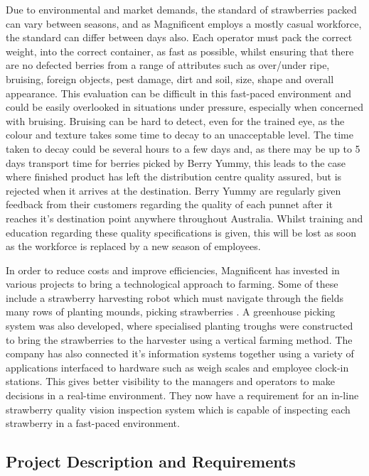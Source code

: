 \documentclass[fleqn,twoside]{article}
\begin{document}
Due to environmental and market demands, the standard of strawberries packed can vary between seasons, and as Magnificent employs a mostly casual workforce, the standard can differ between days also. Each operator must pack the correct weight, into the correct container, as fast as possible, whilst ensuring that there are no defected berries from a range of attributes such as over/under ripe, bruising, foreign objects, pest damage, dirt and soil, size, shape and overall appearance. This evaluation can be difficult in this fast-paced environment and could be easily overlooked in situations under pressure, especially when concerned with bruising. Bruising can be hard to detect, even for the trained eye, as the colour and texture takes some time to decay to an unacceptable level. The time taken to decay could be several hours to a few days and, as there may be up to 5 days transport time for berries picked by Berry Yummy, this leads to the case where finished product has left the distribution centre quality assured, but is rejected when it arrives at the destination. Berry Yummy are regularly given feedback from their customers regarding the quality of each punnet after it reaches it's destination point anywhere throughout Australia. Whilst training and education regarding these quality specifications is given, this will be lost as soon as the workforce is replaced by a new season of employees.  

In order to reduce costs and improve efficiencies, Magnificent has invested in various projects to bring a technological approach to farming. Some of these include a strawberry harvesting robot which must navigate through the fields many rows of planting mounds, picking strawberries \cite{busch}. A greenhouse picking system was also developed, where specialised planting troughs were constructed to bring the strawberries to the harvester using a vertical farming method. The company has also connected it's information systems together using a variety of applications interfaced to hardware such as weigh scales and employee clock-in stations. This gives better visibility to the managers and operators to make decisions in a real-time environment. They now have a requirement for an in-line strawberry quality vision inspection system which is capable of inspecting each strawberry in a fast-paced environment.



\subsection{Project Description and Requirements}
\label{sec:requirements}
\end{document}
